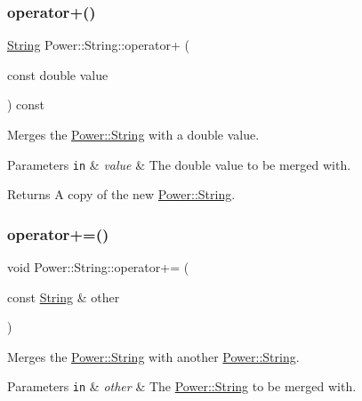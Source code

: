 \subsubsection{\texorpdfstring{operator+()}{operator+()}\hspace{0.1cm}{\footnotesize\ttfamily [11/11]}}
{\footnotesize\ttfamily \hyperlink{class_power_1_1_string}{String} Power\+::\+String\+::operator+ (\begin{DoxyParamCaption}\item[{const double}]{value }\end{DoxyParamCaption}) const\hspace{0.3cm}{\ttfamily [inline]}}



Merges the \hyperlink{class_power_1_1_string}{Power\+::\+String} with a double value. 


\begin{DoxyParams}[1]{Parameters}
\mbox{\tt in}  & {\em value} & The double value to be merged with. \\
\hline
\end{DoxyParams}
\begin{DoxyReturn}{Returns}
A copy of the new \hyperlink{class_power_1_1_string}{Power\+::\+String}. 
\end{DoxyReturn}
\mbox{\label{class_power_1_1_string_aad7a34466104387cc33cafcf04770b39}} 
\subsubsection{\texorpdfstring{operator+=()}{operator+=()}\hspace{0.1cm}{\footnotesize\ttfamily [1/11]}}
{\footnotesize\ttfamily void Power\+::\+String\+::operator+= (\begin{DoxyParamCaption}\item[{const \hyperlink{class_power_1_1_string}{String} \&}]{other }\end{DoxyParamCaption})\hspace{0.3cm}{\ttfamily [inline]}}



Merges the \hyperlink{class_power_1_1_string}{Power\+::\+String} with another \hyperlink{class_power_1_1_string}{Power\+::\+String}. 


\begin{DoxyParams}[1]{Parameters}
\mbox{\tt in}  & {\em other} & The \hyperlink{class_power_1_1_string}{Power\+::\+String} to be merged with. \\
\hline
\end{DoxyParams}
\mbox{\label{class_power_1_1_string_a49e4abf34ef85a8d709aa0b6e37a283e}} 
